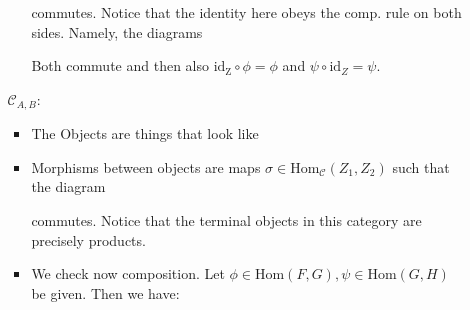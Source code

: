 \documentclass[12pt, twosided]{article}
\begin{document}
\begin{enumerate}
\begin{itemize}
\begin{itemize}
\begin{center}
      \end{center}
      commutes. Notice that the identity here obeys the comp. rule on both sides. Namely, the diagrams
      \begin{center}
      \end{center}
      Both commute and then also \(\mathrm{id_Z} \circ \phi = \phi\) and \(\psi \circ \mathrm{id}_Z = \psi\).
    \end{itemize}
  \item [\(\mathcal{C}_{A,B}\):]
    \begin{itemize}
    \item The Objects are things that look like
      \begin{center}
      \end{center}
    \item Morphisms between objects are maps \(\sigma \in \mathrm{Hom}_\mathcal{C}(Z_1, Z_2)\) such that the diagram
      \begin{center}
      \end{center}
      commutes. Notice that the terminal objects in this category are precisely products.
    \item We check now composition. Let \(\phi \in \mathrm{Hom}(F,G), \psi \in \mathrm{Hom}(G,H)\) be given. Then we have:
      \begin{center}
        \begin{tikzcd}

\end{tikzcd}
\end{center}
\end{itemize}
\end{itemize}
\end{enumerate}
\end{document}
